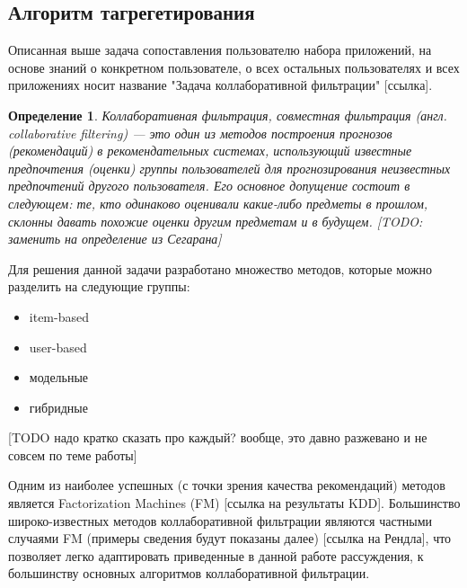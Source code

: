 \documentclass[12pt,a4paper]{report}
\begin{document}
\subsection{Алгоритм тагрегетирования}
Описанная выше задача сопоставления пользователю набора приложений, на основе знаний о конкретном пользователе, о всех остальных пользователях и всех приложениях носит название "Задача коллаборативной фильтрации" [ссылка].

\newtheorem{Def}{Определение}
\begin{Def}
Коллаборативная фильтрация, совместная фильтрация (англ. collaborative filtering) — это один из методов построения прогнозов (рекомендаций) в рекомендательных системах, использующий известные предпочтения (оценки) группы пользователей для прогнозирования неизвестных предпочтений другого пользователя. Его основное допущение состоит в следующем: те, кто одинаково оценивали какие-либо предметы в прошлом, склонны давать похожие оценки другим предметам и в будущем.  [TODO: заменить на определение из Сегарана]
\end{Def}

Для решения данной задачи разработано множество методов, которые можно разделить на следующие группы:
\begin{itemize}
\item item-based
\item user-based
\item модельные
\item гибридные
\end{itemize}
[TODO надо кратко сказать про каждый? вообще, это давно разжевано и не совсем по теме работы]

Одним из наиболее успешных (с точки зрения качества рекомендаций) методов является Factorization Machines (FM) [ссылка на результаты KDD]. Большинство широко-известных методов коллаборативной фильтрации являются частными случаями FM (примеры сведения будут показаны далее) [ссылка на Рендла], что позволяет легко адаптировать приведенные в данной работе рассуждения, к большинству основных алгоритмов коллаборативной фильтрации.
\end{document}
